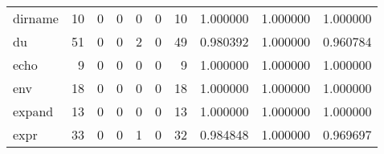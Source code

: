 \begin{tabular}{lrrrrrrrrr}
dirname   &                                      10 &                                                  0 &                                                  0 &                                                  0 &                                                  0 &                                                 10 &                                           1.000000 &                               1.000000 &                             1.000000 \\
du        &                                      51 &                                                  0 &                                                  0 &                                                  2 &                                                  0 &                                                 49 &                                           0.980392 &                               1.000000 &                             0.960784 \\
echo      &                                       9 &                                                  0 &                                                  0 &                                                  0 &                                                  0 &                                                  9 &                                           1.000000 &                               1.000000 &                             1.000000 \\
env       &                                      18 &                                                  0 &                                                  0 &                                                  0 &                                                  0 &                                                 18 &                                           1.000000 &                               1.000000 &                             1.000000 \\
expand    &                                      13 &                                                  0 &                                                  0 &                                                  0 &                                                  0 &                                                 13 &                                           1.000000 &                               1.000000 &                             1.000000 \\
expr      &                                      33 &                                                  0 &                                                  0 &                                                  1 &                                                  0 &                                                 32 &                                           0.984848 &                               1.000000 &                             0.969697 \\

\end{tabular}
